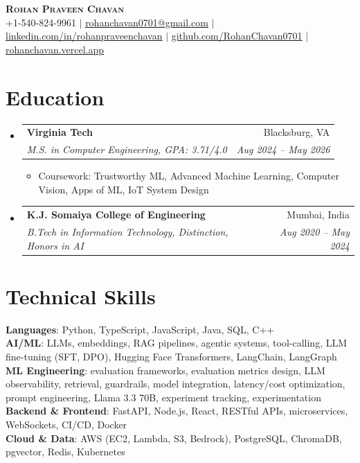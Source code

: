 \documentclass[letterpaper,10pt]{article}
\makeatletter
\newcommand{\resumeItem}[1]{\item\small{#1 \vspace{-2.5pt}}}
\newcommand{\resumeSubheading}[4]{
  \vspace{-2pt}\item
    \begin{tabular*}{0.97\textwidth}[t]{l@{\extracolsep{\fill}}r}
      \textbf{#1} & #2 \\
      \textit{\small#3} & \textit{\small #4} \\
    \end{tabular*}\vspace{-7pt}
}
\newcommand{\resumeSubHeadingListStart}{\begin{itemize}[leftmargin=0.15in, label={}]}
\newcommand{\resumeSubHeadingListEnd}{\end{itemize}}
\newcommand{\resumeItemListStart}{\begin{itemize}}
\newcommand{\resumeItemListEnd}{\end{itemize}\vspace{-5pt}}
\makeatother
\begin{document}
\begin{center}
    \textbf{\Huge \scshape Rohan Praveen Chavan} \\ \vspace{2pt}
    \small +1-540-824-9961 $|$
    \href{mailto:rohanchavan0701@gmail.com}{\underline{rohanchavan0701@gmail.com}} $|$
    \href{https://linkedin.com/in/rohanpraveenchavan}{\underline{linkedin.com/in/rohanpraveenchavan}} $|$
    \href{https://github.com/RohanChavan0701}{\underline{github.com/RohanChavan0701}} $|$
    \href{https://rohanchavan.vercel.app}{\underline{rohanchavan.vercel.app}}
\end{center}

\section{Education}
\resumeSubHeadingListStart
    \resumeSubheading
      {Virginia Tech}{Blacksburg, VA}
      {M.S. in Computer Engineering, GPA: 3.71/4.0}{Aug 2024 -- May 2026}
      \resumeItemListStart
        \resumeItem{Coursework: Trustworthy ML, Advanced Machine Learning, Computer Vision, Apps of ML, IoT System Design}
      \resumeItemListEnd
    \resumeSubheading
      {K.J. Somaiya College of Engineering}{Mumbai, India}
      {B.Tech in Information Technology, Distinction, Honors in AI}{Aug 2020 -- May 2024}
\resumeSubHeadingListEnd

\section{Technical Skills}
\begin{itemize}[leftmargin=0.15in, label={}]
    \small{\item{
     \textbf{Languages}{: Python, TypeScript, JavaScript, Java, SQL, C++} \\
     \textbf{AI/ML}{: LLMs, embeddings, RAG pipelines, agentic systems, tool-calling,
       LLM fine-tuning (SFT, DPO), Hugging Face Transformers, LangChain, LangGraph} \\
     \textbf{ML Engineering}{: evaluation frameworks, evaluation metrics design, LLM observability,
       retrieval, guardrails, model integration, latency/cost optimization, prompt engineering,
       Llama 3.3 70B, experiment tracking, experimentation} \\
     \textbf{Backend \& Frontend}{: FastAPI, Node.js, React, RESTful APIs, microservices,
       WebSockets, CI/CD, Docker} \\
     \textbf{Cloud \& Data}{: AWS (EC2, Lambda, S3, Bedrock), PostgreSQL, ChromaDB, pgvector, Redis, Kubernetes}
    }}
\end{itemize}
\end{document}
